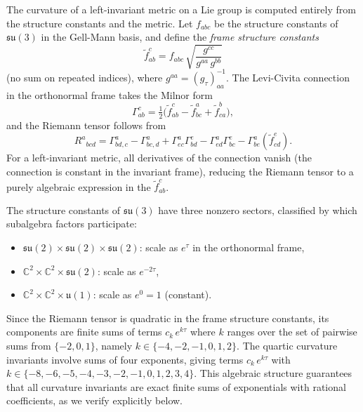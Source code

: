 \documentclass[12pt]{article}
\theoremstyle{definition}
\theoremstyle{remark}
\begin{document}
The curvature of a left-invariant metric on a Lie group is computed entirely from the structure constants and the metric.  Let $f_{abc}$ be the structure constants of $\mathfrak{su}(3)$ in the Gell-Mann basis, and define the \emph{frame structure constants}
\begin{equation}
\label{eq:frame_struct}
\tilde{f}^c_{ab} = f_{abc}\,\sqrt{\frac{g^{cc}}{g^{aa}\,g^{bb}}}
\end{equation}
(no sum on repeated indices), where $g^{aa}=(g_\tau)^{-1}_{aa}$.  The Levi-Civita connection in the orthonormal frame takes the Milnor form~\cite{Milnor1976}
\begin{equation}
\label{eq:connection}
\Gamma^c_{ab} = \tfrac{1}{2}\bigl(\tilde{f}^c_{ab} - \tilde{f}^a_{bc} + \tilde{f}^b_{ca}\bigr),
\end{equation}
and the Riemann tensor follows from
\begin{equation}
\label{eq:riemann}
R^a{}_{bcd} = \Gamma^a_{bd,c} - \Gamma^a_{bc,d} + \Gamma^a_{ec}\Gamma^e_{bd} - \Gamma^a_{ed}\Gamma^e_{bc} - \Gamma^a_{be}(\tilde{f}^e_{cd}).
\end{equation}
For a left-invariant metric, all derivatives of the connection vanish (the connection is constant in the invariant frame), reducing the Riemann tensor to a purely algebraic expression in the $\tilde{f}^c_{ab}$.

The structure constants of $\mathfrak{su}(3)$ have three nonzero sectors, classified by which subalgebra factors participate:
\begin{itemize}
    \item $\mathfrak{su}(2)\times\mathfrak{su}(2)\times\mathfrak{su}(2)$: scale as $e^{\tau}$ in the orthonormal frame,
    \item $\mathbb{C}^2\times\mathbb{C}^2\times\mathfrak{su}(2)$: scale as $e^{-2\tau}$,
    \item $\mathbb{C}^2\times\mathbb{C}^2\times\mathfrak{u}(1)$: scale as $e^0=1$ (constant).
\end{itemize}
Since the Riemann tensor is quadratic in the frame structure constants, its components are finite sums of terms $c_k\,e^{k\tau}$ where $k$ ranges over the set of pairwise sums from $\{-2,0,1\}$, namely $k\in\{-4,-2,-1,0,1,2\}$.  The quartic curvature invariants involve sums of four exponents, giving terms $c_k\,e^{k\tau}$ with $k\in\{-8,-6,-5,-4,-3,-2,-1,0,1,2,3,4\}$.  This algebraic structure guarantees that all curvature invariants are exact finite sums of exponentials with rational coefficients, as we verify explicitly below.
\end{document}
